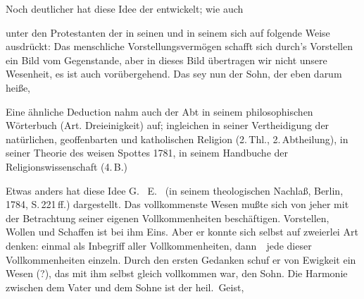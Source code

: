 \begin{aufza}
\begin{aufzb}
\item Noch deutlicher hat diese Idee der  entwickelt; wie auch
\item unter den Protestanten  der in seinen  und in seinem  sich auf folgende Weise ausdrückt: Das menschliche Vorstellungsvermögen schafft sich durch's Vorstellen ein Bild vom Gegenstande, aber in dieses Bild übertragen wir nicht unsere Wesenheit, es ist auch vorübergehend.  Das sey nun der Sohn, der eben darum  heiße, 
\item Eine ähnliche Deduction nahm auch der Abt  in seinem philosophischen Wörterbuch (Art. Dreieinigkeit) auf; ingleichen  in seiner Vertheidigung der natürlichen, geoffenbarten und katholischen Religion (2.\,Thl., 2.\,Abtheilung),  in seiner Theorie des weisen Spottes 1781,  in seinem Handbuche der Religionswissenschaft (4.\,B.) \uA
\item Etwas anders hat diese Idee G.~ E.~ (in seinem theologischen Nachlaß, Berlin, 1784, S.\,221\,ff.) dargestellt. Das vollkommenste Wesen mußte sich von jeher mit der Betrachtung seiner eigenen Vollkommenheiten beschäftigen. Vorstellen, Wollen und Schaffen ist bei ihm Eins. Aber er konnte sich selbst auf zweierlei Art denken: einmal als Inbegriff aller Vollkommenheiten, dann~\ jede dieser Vollkommenheiten einzeln. Durch den ersten Gedanken schuf er von Ewigkeit ein Wesen (?), das mit ihm selbst gleich vollkommen war, den Sohn. Die Harmonie zwischen dem Vater und dem Sohne ist der heil.\ Geist, \usw\

\end{aufzb}
\end{aufza}
